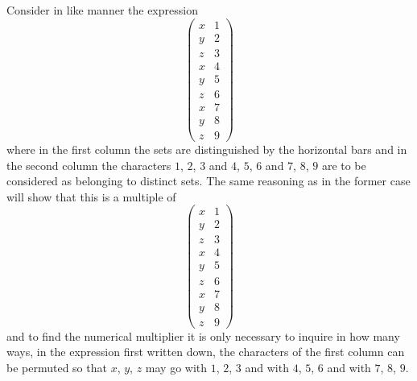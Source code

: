 \documentclass[11pt,a4paper]{book}
\begin{document}
Consider in like manner the expression
\[\begin{pmatrix} x & 1 \\ y & 2 \\ z & 3 \\ \hline x & 4 \\ y & 5 \\ z & 6 \\ \hline x & 7 \\ y & 8 \\ z & 9 \end{pmatrix}\]
where in the first column the sets are distinguished by the horizontal bars and in the second column the characters $1$, $2$, $3$ and $4$, $5$, $6$ and $7$, $8$, $9$ are to be considered as belonging to distinct sets. The same reasoning as in the former case will show that this is a multiple of
\[\begin{pmatrix} x & 1 \\ y & 2 \\ z & 3 \\ \hline x & 4 \\ y & 5 \\ z & 6 \\ \hline x & 7 \\ y & 8 \\ z & 9 \end{pmatrix}\]
and to find the numerical multiplier it is only necessary to inquire in how many ways, in the expression first written down, the characters of the first column can be permuted so that $x$, $y$, $z$ may go with $1$, $2$, $3$ and with $4$, $5$, $6$ and with $7$, $8$, $9$.
\end{document}
